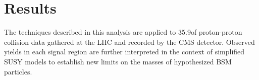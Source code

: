\chapter{Results}
\label{ch:results}
The techniques described in this analysis are applied to 35.9\fbinv of proton-proton collision data gathered at the LHC and recorded by the CMS detector. Observed yields in each signal region are further interpreted in the context of simplified SUSY models to establish new limits on the masses of hypothesized BSM particles.




